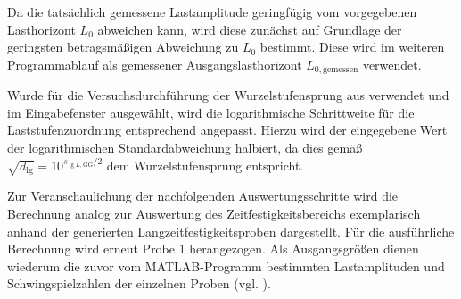 	Da die tatsächlich gemessene Lastamplitude geringfügig vom vorgegebenen Lasthorizont $L_0$ abweichen kann, wird diese zunächst auf Grundlage der geringsten betragsmäßigen Abweichung zu $L_0$ bestimmt. Diese wird im weiteren Programmablauf als gemessener Ausgangslasthorizont $L_{0,\mathrm{gemessen}}$ verwendet.
	
	Wurde für die Versuchsdurchführung der Wurzelstufensprung aus  verwendet und im Eingabefenster ausgewählt, wird die logarithmische Schrittweite für die Laststufenzuordnung entsprechend angepasst. Hierzu wird der eingegebene Wert der logarithmischen Standardabweichung halbiert, da dies gemäß $\sqrt{d_{\lg}} = 10^{s_{\lg L,\mathrm{GG}}/2}$ dem Wurzelstufensprung entspricht.
	
	Zur Veranschaulichung der nachfolgenden Auswertungsschritte wird die Berechnung analog zur Auswertung des Zeitfestigkeitsbereichs exemplarisch anhand der generierten Langzeitfestigkeitsproben dargestellt. Für die ausführliche Berechnung wird erneut Probe 1 herangezogen. Als Ausgangsgrößen dienen wiederum die zuvor vom MATLAB-Programm bestimmten Lastamplituden und Schwingspielzahlen der einzelnen Proben (vgl. ).
